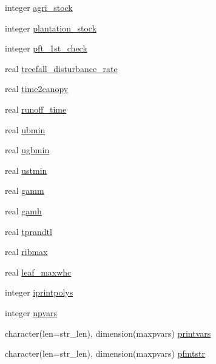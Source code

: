 \begin{DoxyCompactItemize}
integer \hyperlink{structename__coms_1_1ename__vars_a7a77bc951dacf24a3ac1538b524e9c1d}{agri\+\_\+stock}
\item 
integer \hyperlink{structename__coms_1_1ename__vars_a3722272c39c92fba801c8c80d4edf1ad}{plantation\+\_\+stock}
\item 
integer \hyperlink{structename__coms_1_1ename__vars_abfe25a7b4b698d0f161a9d63003a531d}{pft\+\_\+1st\+\_\+check}
\item 
real \hyperlink{structename__coms_1_1ename__vars_a61bcf5b6ae099342995ce09bc5238daa}{treefall\+\_\+disturbance\+\_\+rate}
\item 
real \hyperlink{structename__coms_1_1ename__vars_aad871dfc2ec931fdcfd4ddd5f2f9ee1d}{time2canopy}
\item 
real \hyperlink{structename__coms_1_1ename__vars_aef08f776f2ef7d50653644b9eaf37fe7}{runoff\+\_\+time}
\item 
real \hyperlink{structename__coms_1_1ename__vars_ac54fc029defd28d1d8fedb78cd98d619}{ubmin}
\item 
real \hyperlink{structename__coms_1_1ename__vars_ae126c0ced025c9a41f0734a69b5b0035}{ugbmin}
\item 
real \hyperlink{structename__coms_1_1ename__vars_a9690b1934cac1530df860302829aa820}{ustmin}
\item 
real \hyperlink{structename__coms_1_1ename__vars_aee0fd01490f97880409afe6f3c99c9e9}{gamm}
\item 
real \hyperlink{structename__coms_1_1ename__vars_a4c90193243d7bcbffe51f92616c16be0}{gamh}
\item 
real \hyperlink{structename__coms_1_1ename__vars_a34be383e3743fdc5e13b84d8389adff7}{tprandtl}
\item 
real \hyperlink{structename__coms_1_1ename__vars_a46cfd5226d39262585d702cf5c8c7855}{ribmax}
\item 
real \hyperlink{structename__coms_1_1ename__vars_a9b0702e9d40e182190028928ce9cef0a}{leaf\+\_\+maxwhc}
\item 
integer \hyperlink{structename__coms_1_1ename__vars_a8154efb28ea808886484db3cef32bc28}{iprintpolys}
\item 
integer \hyperlink{structename__coms_1_1ename__vars_a062ee82d7e7fb82721a1be11a9c572f3}{npvars}
\item 
character(len=str\+\_\+len), dimension(maxpvars) \hyperlink{structename__coms_1_1ename__vars_a2eb036b2183786a6266f2959c1314769}{printvars}
\item 
character(len=str\+\_\+len), dimension(maxpvars) \hyperlink{structename__coms_1_1ename__vars_a0f7fb2fd0bc22fff6bc3144268c8ea04}{pfmtstr}

\end{DoxyCompactItemize}
